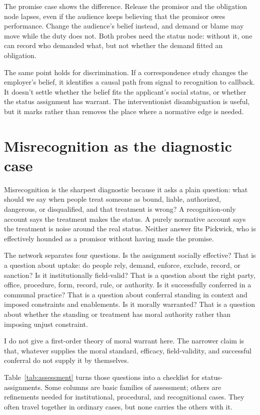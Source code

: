 \documentclass[12pt]{article}
\begin{document}
The promise case shows the difference. Release the promisor and the obligation node lapses, even if the audience keeps believing that the promisor owes performance. Change the audience's belief instead, and demand or blame may move while the duty does not. Both probes need the status node: without it, one can record who demanded what, but not whether the demand fitted an obligation.

The same point holds for discrimination. If a correspondence study changes the employer's belief, it identifies a causal path from signal to recognition to callback. It doesn't settle whether the belief fits the applicant's social status, or whether the status assignment has warrant. The interventionist disambiguation is useful, but it marks rather than removes the place where a normative edge is needed.

\section{Misrecognition as the diagnostic case}
\label{sec:misrecognition}

Misrecognition is the sharpest diagnostic because it asks a plain question: what should we say when people treat someone as bound, liable, authorized, dangerous, or disqualified, and that treatment is wrong? A recognition-only account says the treatment makes the status. A purely normative account says the treatment is noise around the real status. Neither answer fits Pickwick, who is effectively hounded as a promisor without having made the promise.

The network separates four questions. Is the assignment socially effective? That is a question about uptake: do people rely, demand, enforce, exclude, record, or sanction? Is it institutionally field-valid? That is a question about the right party, office, procedure, form, record, rule, or authority. Is it successfully conferred in a communal practice? That is a question about conferral standing in context and imposed constraints and enablements. Is it morally warranted? That is a question about whether the standing or treatment has moral authority rather than imposing unjust constraint.

I do not give a first-order theory of moral warrant here. The narrower claim is that, whatever supplies the moral standard, efficacy, field-validity, and successful conferral do not supply it by themselves.

Table~\ref{tab:assessment} turns those questions into a checklist for status-assignments. Some columns are basic families of assessment; others are refinements needed for institutional, procedural, and recognitional cases. They often travel together in ordinary cases, but none carries the others with it.
\end{document}
